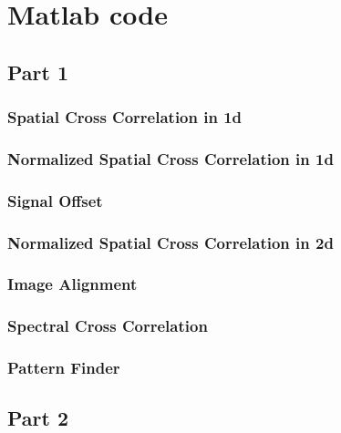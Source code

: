 \chapter{Matlab code}
\section{Part 1}
\subsection{Spatial Cross Correlation in 1d}
 \label{code:1.1_1}

\subsection{Normalized Spatial Cross Correlation in 1d}
 \label{code:1.1_2}

\subsection{Signal Offset}
 \label{code:1.2}

\subsection{Normalized Spatial Cross Correlation in 2d}
 \label{code:1.3}

\subsection{Image Alignment}
 \label{code:1.4}

\subsection{Spectral Cross Correlation}
 \label{code:1.5}

\subsection{Pattern Finder}
 \label{code:1.6}

\section{Part 2}
